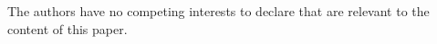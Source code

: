 \documentclass[runningheads]{llncs}
\begin{document}
\begin{credits}
\subsubsection{\discintname}
The authors have no competing interests to declare that are
relevant to the content of this paper.
\end{credits}








\end{document}
